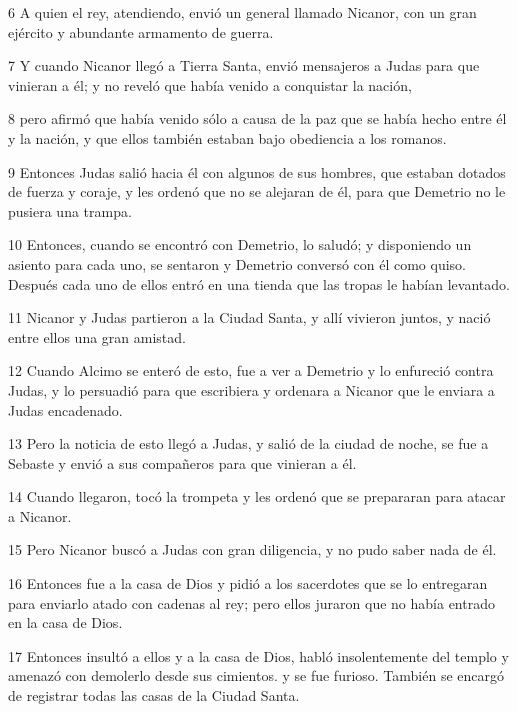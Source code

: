 \par 6 A quien el rey, atendiendo, envió un general llamado Nicanor, con un gran ejército y abundante armamento de guerra.

\par 7 Y cuando Nicanor llegó a Tierra Santa, envió mensajeros a Judas para que vinieran a él; y no reveló que había venido a conquistar la nación,

\par 8 pero afirmó que había venido sólo a causa de la paz que se había hecho entre él y la nación, y que ellos también estaban bajo obediencia a los romanos.

\par 9 Entonces Judas salió hacia él con algunos de sus hombres, que estaban dotados de fuerza y ​​coraje, y les ordenó que no se alejaran de él, para que Demetrio no le pusiera una trampa.

\par 10 Entonces, cuando se encontró con Demetrio, lo saludó; y disponiendo un asiento para cada uno, se sentaron y Demetrio conversó con él como quiso. Después cada uno de ellos entró en una tienda que las tropas le habían levantado.

\par 11 Nicanor y Judas partieron a la Ciudad Santa, y allí vivieron juntos, y nació entre ellos una gran amistad.

\par 12 Cuando Alcimo se enteró de esto, fue a ver a Demetrio y lo enfureció contra Judas, y lo persuadió para que escribiera y ordenara a Nicanor que le enviara a Judas encadenado.

\par 13 Pero la noticia de esto llegó a Judas, y salió de la ciudad de noche, se fue a Sebaste y envió a sus compañeros para que vinieran a él.

\par 14 Cuando llegaron, tocó la trompeta y les ordenó que se prepararan para atacar a Nicanor.

\par 15 Pero Nicanor buscó a Judas con gran diligencia, y no pudo saber nada de él.

\par 16 Entonces fue a la casa de Dios y pidió a los sacerdotes que se lo entregaran para enviarlo atado con cadenas al rey; pero ellos juraron que no había entrado en la casa de Dios.

\par 17 Entonces insultó a ellos y a la casa de Dios, habló insolentemente del templo y amenazó con demolerlo desde sus cimientos. y se fue furioso. También se encargó de registrar todas las casas de la Ciudad Santa.

